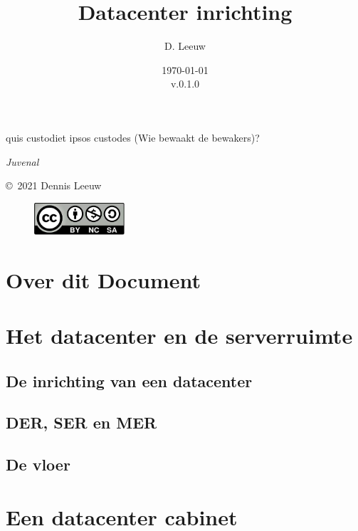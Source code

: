 \documentclass[a4paper,12pt,twoside,openright,titlepage]{book}
\author{D. Leeuw}
\title{Datacenter inrichting}
\date{\today\\v.0.1.0}
\begin{document}

\maketitle

\epigraph{quis custodiet ipsos custodes (Wie bewaakt de bewakers)?}{\textit{Juvenal}}

\newpage

\copyright\ 2021 Dennis Leeuw\\

\begin{figure}[H]
\includegraphics[width=0.3\textwidth]{CC-BY-SA-NC.png}
\end{figure}

\bigskip




\frontmatter
\chapter{Over dit Document}



\tableofcontents

\mainmatter

\chapter{Het datacenter en de serverruimte}

\section{De inrichting van een datacenter}

\section{DER, SER en MER}

\section{De vloer}


\chapter{Een datacenter cabinet}

\end{document}
